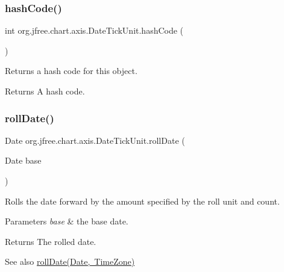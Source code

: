 \subsubsection{\texorpdfstring{hash\+Code()}{hashCode()}}
{\footnotesize\ttfamily int org.\+jfree.\+chart.\+axis.\+Date\+Tick\+Unit.\+hash\+Code (\begin{DoxyParamCaption}{ }\end{DoxyParamCaption})}

Returns a hash code for this object.

\begin{DoxyReturn}{Returns}
A hash code. 
\end{DoxyReturn}
\mbox{\label{classorg_1_1jfree_1_1chart_1_1axis_1_1_date_tick_unit_adc12d633c56a6df91f743a36e79aa95b}} 
\subsubsection{\texorpdfstring{roll\+Date()}{rollDate()}\hspace{0.1cm}{\footnotesize\ttfamily [1/2]}}
{\footnotesize\ttfamily Date org.\+jfree.\+chart.\+axis.\+Date\+Tick\+Unit.\+roll\+Date (\begin{DoxyParamCaption}\item[{Date}]{base }\end{DoxyParamCaption})}

Rolls the date forward by the amount specified by the roll unit and count.


\begin{DoxyParams}{Parameters}
{\em base} & the base date.\\
\hline
\end{DoxyParams}
\begin{DoxyReturn}{Returns}
The rolled date.
\end{DoxyReturn}
\begin{DoxySeeAlso}{See also}
\mbox{\hyperlink{classorg_1_1jfree_1_1chart_1_1axis_1_1_date_tick_unit_a2c33bd77b76cc0ff127b39d4e399cf8e}{roll\+Date(\+Date, Time\+Zone)}} 
\end{DoxySeeAlso}
\mbox{\label{classorg_1_1jfree_1_1chart_1_1axis_1_1_date_tick_unit_a2c33bd77b76cc0ff127b39d4e399cf8e}} 
